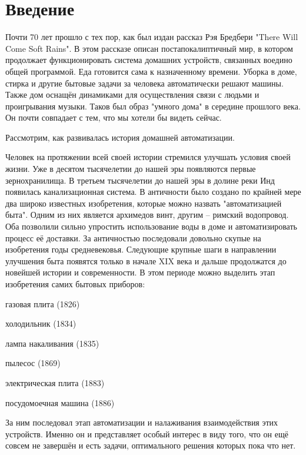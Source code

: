 \section{Введение}

Почти 70 лет прошло с тех пор, как был издан рассказ Рэя Бредбери "There Will Come Soft Rains".
В этом рассказе описан постапокалиптичный мир, в котором продолжает функционировать система домашних устройств, связанных воедино общей программой.
Еда готовится сама к назначенному времени. Уборка в доме, стирка и другие бытовые задачи за человека автоматически решают машины.
Также дом оснащён динамиками для осуществления связи с людьми и проигрывания музыки.
Таков был образ "умного дома" в середине прошлого века. Он почти совпадает с тем, что мы хотели бы видеть сейчас.

Рассмотрим, как развивалась история домашней автоматизации.

Человек на протяжении всей своей истории стремился улучшать условия своей жизни.
Уже в десятом тысячелетии до нашей эры появляются первые зернохранилища.
В третьем тысячелетии до нашей эры в долине реки Инд появилась канализационная система.
В античности было создано по крайней мере два широко известных изобретения, которые можно назвать "автоматизацией быта". Одним из них является архимедов винт, другим -- римский водопровод.
Оба позволили сильно упростить использование воды в доме и автоматизировать процесс её доставки.
За античностью последовали довольно скупые на изобретения годы средневековья.
Следующие крупные шаги в направлении улучшения быта появятся только в начале XIX века и дальше продолжатся до новейшей истории и современности.
В этом периоде можно выделить этап изобретения самих бытовых приборов: \cite{ToolsHistory}
\begin{list}{}{}
\item газовая плита (1826) 
\item холодильник (1834)
\item лампа накаливания (1835)
\item пылесос (1869)
\item электрическая плита (1883)
\item посудомоечная машина (1886)
\end{list}
За ним последовал этап автоматизации и налаживания взаимодействия этих устройств.
Именно он и представляет особый интерес в виду того, что он ещё совсем не завершён и есть задачи, оптимального решения которых пока что нет.

